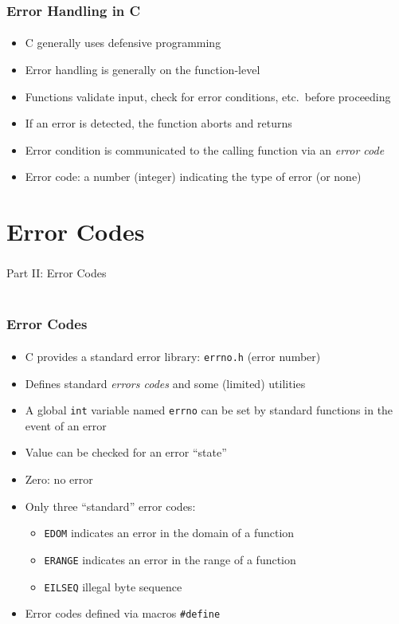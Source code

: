 \documentclass[]{beamer}
\begin{document}
\begin{frame}[fragile]
    \frametitle{Error Handling in C}
    \framesubtitle{}


\begin{itemize}[<+->]
  \item C generally uses defensive programming
  \item Error handling is generally on the function-level 
  \item Functions validate input, check for error conditions, etc.\ before proceeding
  \item If an error is detected, the function aborts and returns
  \item Error condition is communicated to the calling function via an \emph{error code}
  \item Error code: a number (integer) indicating the type of error (or none)
\end{itemize}

\end{frame}

\section{Error Codes}

\begin{frame}
    \frametitle{}
    \framesubtitle{}
    
    \begin{center}
    {\Huge Part II: Error Codes}\\
    {\Large ~}
    \end{center}

\end{frame}

\begin{frame}[fragile]
    \frametitle{Error Codes}
    \framesubtitle{}

\begin{itemize}[<+->]
  \item C provides a standard error library: \texttt{errno.h} (error number)
  \item Defines standard \emph{errors codes} and some (limited) utilities
  \item A global \texttt{int} variable named \texttt{errno} can be set by standard functions in the event of an error
  \item Value can be checked for an error ``state''
  \item Zero: no error
  \item Only three ``standard'' error codes:
  \begin{itemize}
    \item \texttt{EDOM} indicates an error in the domain of a function
    \item \texttt{ERANGE} indicates an error in the range of a function
    \item \texttt{EILSEQ} illegal byte sequence
  \end{itemize}
  \item Error codes defined via macros \texttt{#define}
\end{itemize}

\end{frame}
\end{document}

